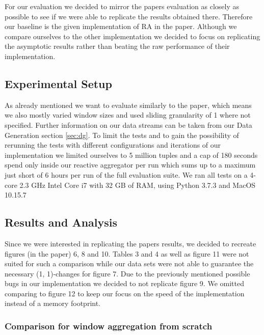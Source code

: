 For our evaluation we decided to mirror the papers evaluation as closely as possible
to see if we were able to replicate the results obtained there.
Therefore our baseline is the given implementation of RA in the paper.
Although we compare ourselves to the other implementation we decided to focus on
replicating the asymptotic results rather than beating the raw performance of their implementation.

\subsection{Experimental Setup}
As already mentioned we want to evaluate similarly to the paper, which means we also mostly varied
window sizes and used sliding granularity of 1 where not specified.
Further information on our data streams can be taken from our Data Generation section \ref{sec:dg}.
To limit the tests and to gain the possibility of rerunning the tests with different configurations
and iterations of our implementation we limited ourselves to 5 million tuples and
a cap of 180 seconds spend only inside our reactive aggregator per run
which sums up to a maximum just short of 6 hours per run of the full evaluation suite.
We ran all tests on a 4-core 2.3 GHz Intel Core i7 with 32 GB of RAM, using
Python 3.7.3 and MacOS 10.15.7

\subsection{Results and Analysis}
Since we were interested in replicating the papers results, we decided to
recreate figures (in the paper) 6, 8 and 10. Tables 3 and 4 as well as figure 11 were not suited
for such a comparison while our data sets were not able to guarantee the necessary
(1, 1)-changes for figure 7. Due to the previously mentioned possible bugs in our
implementation we decided to not replicate figure 9. We omitted comparing to figure 12
to keep our focus on the speed of the implementation instead of a memory footprint.

\subsubsection{Comparison for window aggregation from scratch}



